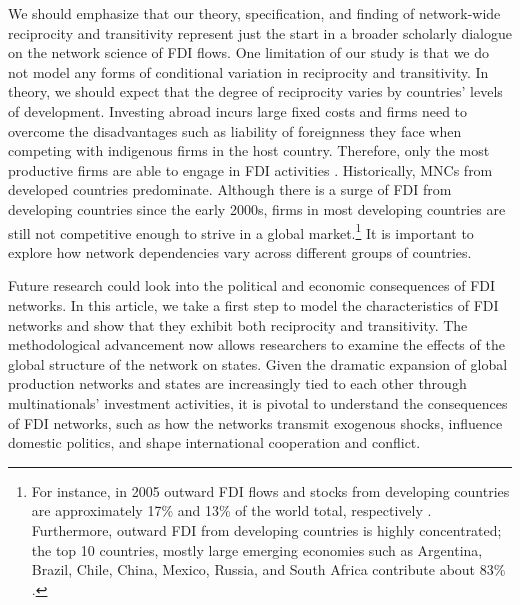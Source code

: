 \documentclass[reqno,onecolumn,letterpaper,12pt]{article}
\begin{document}


We should emphasize that our theory, specification, and finding of network-wide reciprocity and transitivity represent just the start in a broader scholarly dialogue on the network science of FDI flows. One limitation of our study is that we do not model any forms of conditional variation in reciprocity and transitivity. In theory, we should expect that the degree of reciprocity varies by countries' levels of development. Investing abroad incurs large fixed costs and firms need to overcome the disadvantages such as liability of foreignness they face when competing with indigenous firms in the host country. Therefore, only the most productive firms are able to engage in FDI activities \citep{Melitz:2003,Helpman_et_al:2004}. Historically, MNCs from developed countries predominate. Although there is a surge of FDI from developing countries since the early 2000s, firms in most developing countries are still not competitive enough to strive in a global market.\footnote{For instance, in 2005 outward FDI flows and stocks from developing countries are approximately 17\% and 13\% of the world total, respectively \citep{UNCTAD:2006}. Furthermore, outward FDI from developing countries is highly concentrated; the top 10 countries, mostly large emerging economies such as Argentina, Brazil, Chile, China, Mexico, Russia, and South Africa contribute about 83\% \citep{UNCTAD:2006}. } It is important to explore how network dependencies vary across different groups of countries.

Future research could look into the political and economic consequences of FDI networks. In this article, we take a first step to model the characteristics of FDI networks and show that they exhibit both reciprocity and transitivity. The methodological advancement now allows researchers to examine the effects of the global structure of the network on states. Given the dramatic expansion of global production networks and states are increasingly tied to each other through multinationals' investment activities, it is pivotal to understand the consequences of FDI networks, such as how the networks transmit exogenous shocks, influence domestic politics, and shape international cooperation and conflict.
\end{document}

